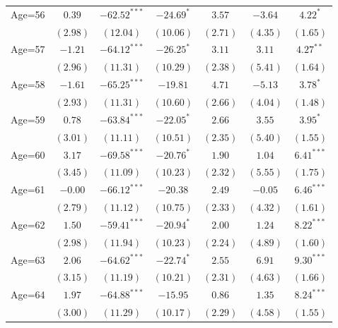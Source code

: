 \documentclass[fullpage]{paper}
\begin{document}
\begin{center}
\begin{longtable}{l c c c c c c }
Age=56      & $0.39$       & $-62.52^{***}$ & $-24.69^{*}$  & $3.57$       & $-3.64$       & $4.22^{*}$    \\
            & $(2.98)$     & $(12.04)$      & $(10.06)$     & $(2.71)$     & $(4.35)$      & $(1.65)$      \\
Age=57      & $-1.21$      & $-64.12^{***}$ & $-26.25^{*}$  & $3.11$       & $3.11$        & $4.27^{**}$   \\
            & $(2.96)$     & $(11.31)$      & $(10.29)$     & $(2.38)$     & $(5.41)$      & $(1.64)$      \\
Age=58      & $-1.61$      & $-65.25^{***}$ & $-19.81$      & $4.71$       & $-5.13$       & $3.78^{*}$    \\
            & $(2.93)$     & $(11.31)$      & $(10.60)$     & $(2.66)$     & $(4.04)$      & $(1.48)$      \\
Age=59      & $0.78$       & $-63.84^{***}$ & $-22.05^{*}$  & $2.66$       & $3.55$        & $3.95^{*}$    \\
            & $(3.01)$     & $(11.11)$      & $(10.51)$     & $(2.35)$     & $(5.40)$      & $(1.55)$      \\
Age=60      & $3.17$       & $-69.58^{***}$ & $-20.76^{*}$  & $1.90$       & $1.04$        & $6.41^{***}$  \\
            & $(3.45)$     & $(11.09)$      & $(10.23)$     & $(2.32)$     & $(5.55)$      & $(1.75)$      \\
Age=61      & $-0.00$      & $-66.12^{***}$ & $-20.38$      & $2.49$       & $-0.05$       & $6.46^{***}$  \\
            & $(2.79)$     & $(11.12)$      & $(10.75)$     & $(2.33)$     & $(4.32)$      & $(1.61)$      \\
Age=62      & $1.50$       & $-59.41^{***}$ & $-20.94^{*}$  & $2.00$       & $1.24$        & $8.22^{***}$  \\
            & $(2.98)$     & $(11.94)$      & $(10.23)$     & $(2.24)$     & $(4.89)$      & $(1.60)$      \\
Age=63      & $2.06$       & $-64.62^{***}$ & $-22.74^{*}$  & $2.55$       & $6.91$        & $9.30^{***}$  \\
            & $(3.15)$     & $(11.19)$      & $(10.21)$     & $(2.31)$     & $(4.63)$      & $(1.66)$      \\
Age=64      & $1.97$       & $-64.88^{***}$ & $-15.95$      & $0.86$       & $1.35$        & $8.24^{***}$  \\
            & $(3.00)$     & $(11.29)$      & $(10.17)$     & $(2.29)$     & $(4.58)$      & $(1.55)$      \\

\end{longtable}
\end{center}
\end{document}
